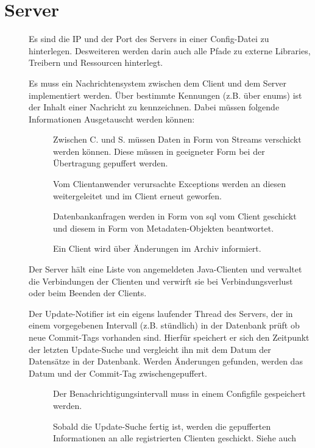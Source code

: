 \section{Server} \label{spec:server}
\begin{description}
	\item []
		Es sind die IP und der Port des Servers in einer Config-Datei zu hinterlegen.
		Desweiteren werden darin auch alle Pfade zu externe Libraries, Treibern und Ressourcen
		hinterlegt.
	\item []
		Es muss ein Nachrichtensystem zwischen dem Client und dem Server implementiert werden.
		Über bestimmte Kennungen (z.B. über enums) ist der Inhalt einer Nachricht zu kennzeichnen.
		Dabei müssen folgende Informationen Ausgetauscht werden können:
		\begin{description}
	\item []
		Zwischen C. und S. müssen Daten in Form von Streams verschickt werden können.
		Diese müssen in geeigneter Form bei der Übertragung gepuffert werden.
	\item []
		Vom Clientanwender verursachte Exceptions werden an diesen weitergeleitet und 
		im Client erneut geworfen.
	\item []
		Datenbankanfragen werden in Form von sql vom Client geschickt und diesem
		in Form von Metadaten-Objekten beantwortet.
	\item []
		Ein Client wird über Änderungen im Archiv informiert.
\end{description}
	\item []
		Der Server hält eine Liste von angemeldeten Java-Clienten und 
		verwaltet die Verbindungen der Clienten und verwirft sie bei Verbindungsverlust oder 
		beim Beenden der Clients. 
	\item []
		Der Update-Notifier ist ein eigens laufender Thread des Servers, der in einem vorgegebenen Intervall (z.B. stündlich) in der Datenbank prüft ob neue Commit-Tags vorhanden sind.
		Hierfür speichert er sich den Zeitpunkt der letzten Update-Suche und vergleicht ihn mit dem Datum der Datensätze in der Datenbank.
		Werden Änderungen gefunden, werden das Datum und der Commit-Tag zwischengepuffert.
		\begin{description}
			\item []
				Der Benachrichtigungsintervall muss in einem Configfile gespeichert werden.
			\item []
				Sobald die Update-Suche fertig ist, 
				werden die gepufferten Informationen an alle registrierten Clienten geschickt.
				Siehe auch 
		\end{description}
\end{description}

